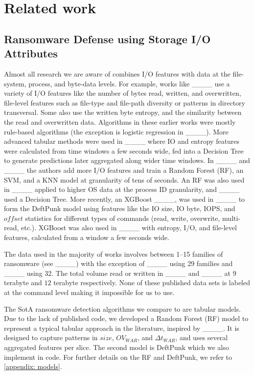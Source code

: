 \section{Related work}
\subsection{Ransomware Defense using Storage I/O Attributes}
\label{RW_w_IO}
Almost all research we are aware of combines I/O features with data at the file-system, process, and byte-data levels. For example, works like ____ use a variety of I/O features like the number of bytes read, written, and overwritten, file-level features such as file-type and file-path diversity or patterns in directory transversal. Some also use the written byte entropy, and the similarity between the read and overwritten data. Algorithms in these earlier works were mostly rule-based algorithms (the exception is logistic regression in ____). More advanced tabular methods were used in ____ where IO and entropy features were calculated from time windows a few seconds wide, fed into a Decision Tree to generate predictions later aggregated along wider time windows. In ____ and ____ the authors add more I/O features and train a Random Forest (RF), an SVM, and a KNN model at granularity of tens of seconds. An RF was also used in ____ applied to higher OS data at the process ID granularity, and ____ used a Decision Tree. More recently, an XGBoost ____, was used in ____ to form the DeftPunk model using features like the IO size, IO byte, IOPS, and $offset$ statistics for different types of commands (read, write, overwrite, multi-read, etc.). XGBoost was also used in ____ with entropy, I/O, and file-level features, calculated from a window a few seconds wide.

The data used in the majority of works involves between 1--15 families of ransomware (see ____) with the exception of ____ using 29 families and ____ using 32. 
The total volume read or written in ____ and ____ at $9$ terabyte and $12$ terabyte respectively. 
None of these published data sets is labeled at the command level making it impossible for us to use.

The SotA ransomware detection algorithms we compare to are tabular models. Due to the lack of published code, we developed a Random Forest (RF) model to represent a typical tabular approach in the literature, inspired by ____. It is designed to capture patterns in $size$, $OV_{WAR}$, and $\Delta t_{WAR}$, and uses several aggregated features per slice. The second model is DeftPunk which we also implement in code. For further details on the RF and DeftPunk, we refer to \cref{appendix: models}.


